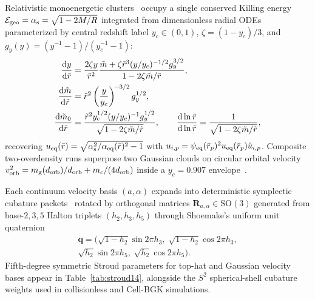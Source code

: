 Relativistic monoenergetic clusters~\cite{1985ApJ...298...34S} occupy a single conserved Killing energy $\mathcal{E}_{\rm geo} = \alpha_{\rm s} = \sqrt{1 - 2M/R}$ integrated from dimensionless radial ODEs parameterized by central redshift label $y_c \in (0, 1)$, $\zeta = (1-y_c)/3$, and $g_y(y) = (y^{-1}-1)/(y_c^{-1}-1)$:
\begin{align}\label{eq:app_structure}
\frac{\mathrm{d} y}{\mathrm{d}\tilde{r}} &= \frac{2\zeta y}{\tilde{r}^2}\frac{\tilde{m} + \zeta\tilde{r}^3(y/y_c)^{-1/2}g_y^{3/2}}{1 - 2\zeta\tilde{m}/\tilde{r}}, \nonumber\\
\frac{\mathrm{d}\tilde{m}}{\mathrm{d}\tilde{r}} &= \tilde{r}^2\left(\frac{y}{y_c}\right)^{\!-3/2}g_y^{1/2}, \nonumber\\
\frac{\mathrm{d}\tilde{m}_0}{\mathrm{d}\tilde{r}} &= \frac{\tilde{r}^2 y_c^{1/2}(y/y_c)^{-1}g_y^{1/2}}{\sqrt{1 - 2\zeta\tilde{m}/\tilde{r}}}, \qquad
\frac{\mathrm{d}\ln\bar{r}}{\mathrm{d}\ln\tilde{r}} = \frac{1}{\sqrt{1 - 2\zeta\tilde{m}/\tilde{r}}},
\end{align}
recovering $u_{\rm eq}(\bar{r}) = \sqrt{\alpha_{\rm s}^2/\alpha_{\rm eq}(\bar{r})^2 - 1}$ with $u_{i,p} = \psi_{\rm eq}(\bar{r}_p)^2 u_{\rm eq}(\bar{r}_p)\hat{u}_{i,p}$. Composite two-overdensity runs superpose two Gaussian clouds on circular orbital velocity $v_{\rm orb}^2 = m_{\rm g}(d_{\rm orb})/d_{\rm orb} + m_c/(4d_{\rm orb})$ inside a $y_c = 0.907$ envelope~\cite{Wu:2026nrpic}.

Each continuum velocity basis $(a,\alpha)$ expands into deterministic symplectic cubature packets~\cite{Stroud:1971} rotated by orthogonal matrices $\bm{R}_{a,\alpha} \in \mathrm{SO}(3)$ generated from base-$2,3,5$ Halton triplets $(h_2, h_3, h_5)$ through Shoemake's uniform unit quaternion
\begin{multline}\label{eq:shoemake_q}
\bm{q} = \big(\sqrt{1-h_2}\sin 2\pi h_3,\;\sqrt{1-h_2}\cos 2\pi h_3,\\
\sqrt{h_2}\sin 2\pi h_5,\;\sqrt{h_2}\cos 2\pi h_5\big).
\end{multline}
Fifth-degree symmetric Stroud parameters for top-hat and Gaussian velocity bases appear in Table~\ref{tab:stroud14}, alongside the $S^2$ spherical-shell cubature weights used in collisionless and Cell-BGK simulations.

